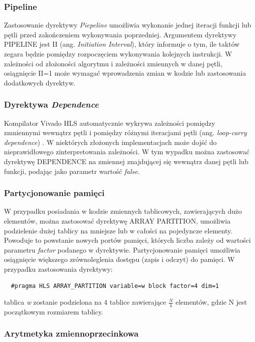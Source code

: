 \subsubsection{Pipeline}
Zastosowanie dyrektywy \emph{Piepeline} umożliwia wykonanie jednej iteracji funkcji lub pętli przed zakończeniem wykonywania poprzedniej. Argumentem dyrektywy PIPELINE jest II (ang. \emph{Initiation Interval}), który informuje o tym, ile taktów zegara będzie pomiędzy rozpoczęciem wykonywania kolejnych instrukcji.
W zależności od złożoności algorytmu i zależności zmiennych w danej pętli, osiągnięcie II=1 może wymagać wprowadzenia zmian w kodzie lub zastosowania dodatkowych dyrektyw.

\subsubsection{Dyrektywa \emph{Dependence}}

Kompilator Vivado HLS automatycznie wykrywa zależności pomiędzy zmniennymi wewnątrz pętli i pomiędzy różnymi iteracjami pętli (ang. \emph{loop-carry dependence}) \cite{hls-pragmas}. W niektórych złożonych implementacjach może dojść do nieprawidłowego zinterpretowania zależności. W tym wypadku można zastosować dyrektywę DEPENDENCE na zmiennej znajdującej się wewnątrz danej pętli lub funkcji, podając jako parametr wartość \emph{false}.

\subsubsection{Partycjonowanie pamięci}

W przypadku posiadania w kodzie zmiennych tablicowych, zawierających dużo elementów, można zastosować dyrektywę ARRAY PARTITION, umożliwia podzielenie dużej tablicy na mniejsze lub w całości na pojedyncze elementy. Powoduje to powstanie nowych portów pamięci, których liczba zależy od wartości parametru \emph{factor} podanego w dyrektywie. Partycjonowanie pamięci umożliwia osiągnięcie większego zrównoleglenia dostępu (zapis i odczyt) do pamięci. W przypadku zastosowania dyrektywy:
\begin{verbatim}
  #pragma HLS ARRAY_PARTITION variable=w block factor=4 dim=1
\end{verbatim}
tablica \emph{w} zostanie podzielona na 4 tablice zawierające $\frac{N}{4}$ elementów, gdzie N jest początkowym rozmiarem tablicy. 

\subsubsection{Arytmetyka zmiennoprzecinkowa}

